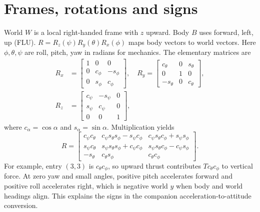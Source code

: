 \section{Frames, rotations and signs}
World $W$ is a local right-handed frame with $z$ upward. Body $B$ uses forward,
left, up (FLU). $R=R_z(\psi)R_y(\theta)R_x(\phi)$ maps body vectors to world
vectors. Here $\phi,\theta,\psi$ are roll, pitch, yaw in radians for mechanics.
The elementary matrices are
\begin{align}
R_x&=\begin{bmatrix}1&0&0\\0&c_\phi&-s_\phi\\0&s_\phi&c_\phi\end{bmatrix},\quad
R_y=\begin{bmatrix}c_\theta&0&s_\theta\\0&1&0\\-s_\theta&0&c_\theta\end{bmatrix},\\
R_z&=\begin{bmatrix}c_\psi&-s_\psi&0\\s_\psi&c_\psi&0\\0&0&1\end{bmatrix},
\end{align}
where $c_\alpha=\cos\alpha$ and $s_\alpha=\sin\alpha$. Multiplication yields
\begin{equation}
R=\begin{bmatrix}
c_\psi c_\theta&c_\psi s_\theta s_\phi-s_\psi c_\phi&c_\psi s_\theta c_\phi+s_\psi s_\phi\\
s_\psi c_\theta&s_\psi s_\theta s_\phi+c_\psi c_\phi&s_\psi s_\theta c_\phi-c_\psi s_\phi\\
-s_\theta&c_\theta s_\phi&c_\theta c_\phi
\end{bmatrix}.
\end{equation}
For example, entry $(3,3)$ is $c_\theta c_\phi$, so upward thrust contributes
$T c_\theta c_\phi$ to vertical force. At zero yaw and small angles, positive
pitch accelerates forward and positive roll accelerates right, which is
negative world $y$ when body and world headings align. This explains the signs
in the companion acceleration-to-attitude conversion.

